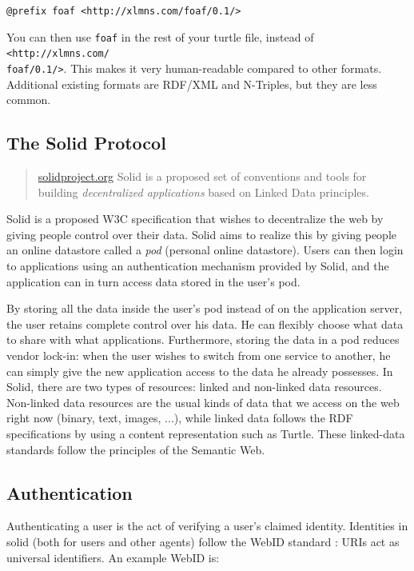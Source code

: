 \texttt{@prefix foaf <http://xlmns.com/foaf/0.1/>}

\noindent You can then use \texttt{foaf} in the rest of your turtle file, instead of \texttt{<http://xlmns.com/\\foaf/0.1/>}. This makes it very human-readable compared to other formats. Additional existing formats are \gls{RDF}/XML and N-Triples, but they are less common.

\subsection{The Solid Protocol}
\begin{quote}{\href{https://solidproject.org}{solidproject.org}}
    Solid is a proposed set of conventions and tools for building \textit{decentralized applications} based on Linked Data principles.
\end{quote}
\noindent Solid \citep{solid} is a proposed W3C specification that wishes to decentralize the web by giving people control over their data. Solid aims to realize this by giving people an online datastore called a \textit{pod} (personal online datastore). Users can then login to applications using an authentication mechanism provided by Solid, and the application can in turn access data stored in the user's pod.

By storing all the data inside the user's pod instead of on the application server, the user retains complete control over his data. He can flexibly choose what data to share with what applications. Furthermore, storing the data in a pod reduces vendor lock-in: when the user wishes to switch from one service to another, he can simply give the new application access to the data he already possesses. 
In Solid, there are two types of resources: linked and non-linked data resources. Non-linked data resources are the usual kinds of data that we access on the web right now (binary, text, images, ...), while linked data follows the 
 \gls{RDF} specifications by using a content representation such as Turtle. These linked-data standards follow the principles of the Semantic Web.

\subsection{Authentication}
Authenticating a user is the act of verifying a user's claimed identity. Identities in solid (both for users and other agents) follow the WebID standard \citep{webid}: URIs act as universal identifiers. An example WebID is:

